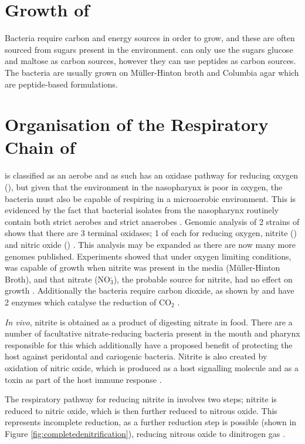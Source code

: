 \section{Growth of \Nm{}}
Bacteria require carbon and energy sources in order to grow, and these are often sourced from sugars present in the environment. \Nm{} can only use the sugars glucose and maltose as carbon sources\cite{Exley2005,Beno1968}, however they can use peptides as carbon sources. The bacteria are usually grown on M\"uller-Hinton broth and Columbia agar which are peptide-based formulations. 

\section{Organisation of the Respiratory Chain of \Nm{}}
\Nm{} is classified as an aerobe and as such has an oxidase pathway for reducing oxygen (\cOxygen{}), but given that the environment in the nasopharynx is poor in oxygen, the bacteria must also be capable of respiring in a microaerobic environment. This is evidenced by the fact that bacterial isolates from the nasopharynx routinely contain both strict aerobes and strict anaerobes \cite{Rock2005}. Genomic analysis of 2 strains of \Nm{} shows that there are 3 terminal oxidases; 1 of each for reducing oxygen, nitrite (\cNitrite{}) and nitric oxide (\cNO{}) \cite{Rock2005a}. This analysis may be expanded as there are now many more genomes published. Experiments showed that under oxygen limiting conditions, \Nm{} was capable of growth when nitrite was present in the media (M\"uller-Hinton Broth), and that nitrate (NO$_{\textrm{3}}^{\textrm{-}}$), the probable source for nitrite, had no effect on growth \cite{Rock2005a}. Additionally the bacteria require carbon dioxide, as shown by \citet{Tuttle1952} and have 2 enzymes which catalyse the reduction of CO$_{\textrm{2}}$ \cite{DeVoe1982}.

\textit{In vivo}, nitrite is obtained as a product of digesting nitrate in food. There are a number of facultative nitrate-reducing bacteria present in the mouth and pharynx responsible for this \cite{Rock2005} which additionally have a proposed benefit of protecting the host against peridontal and cariogenic bacteria\cite{Lundberg2004}. Nitrite is also created by oxidation of nitric oxide, which is produced as a host signalling molecule and as a toxin as part of the host immune response \cite{Lundberg2004,Rock2005}.

The respiratory pathway for reducing nitrite in \Nm{} involves two steps; nitrite is reduced to nitric oxide, which is then further reduced to nitrous oxide. This represents incomplete reduction, as a further reduction step is possible (shown in Figure \ref{fig:completedenitrification}), reducing nitrous oxide to dinitrogen gas \cite{Rock2005,Deeudom2006}.

